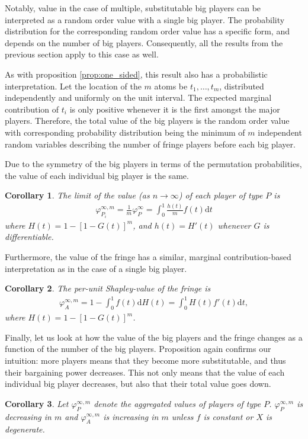 \documentclass[a4paper]{article}
\newtheorem{corollary}{Corollary}
\newcommand{\dt}{\mathrm{d}t}
\newcommand{\dH}{\mathrm{d}H}
\begin{document}
Notably, value in the case of multiple, substitutable big players can be interpreted as a random order value with a single big player.
The probability distribution for the corresponding random order value has a specific form, and depends on the number of big players.
Consequently, all the results from the previous section apply to this case as well.

As with proposition \ref{prop:one_sided}, this result also has a probabilistic interpretation.
Let the location of the $m$ atoms be $t_1, \dots, t_m$, distributed independently and uniformly on the unit interval.
The expected marginal contribution of $t_i$ is only positive whenever it is the first amongst the major players.
Therefore, the total value of the big players is the random order value with corresponding probability distribution being the minimum of $m$ independent random variables describing the number of fringe players before each big player.

Due to the symmetry of the big players in terms of the permutation probabilities, the value of each individual big player is the same.
\begin{corollary}
    \label{prop:multiple_platforms_individual}
    The limit of the value (as $n \to \infty$) of each player of type $P$ is
    \begin{align*}
        \varphi_{P_i}^{\infty, m} = \frac{1}{m} \varphi_P^\infty = \int_0^1 \frac{h(t)}{m} f(t) \dt
    \end{align*}
    where $H(t) = 1 - [1 - G(t)]^m$, and $h(t) = H'(t)$ whenever $G$ is differentiable.
\end{corollary}
Furthermore, the value of the fringe has a similar, marginal contribution-based interpretation as in the case of a single big player.
\begin{corollary}
    \label{cor:multiple_platforms}
    The per-unit Shapley-value of the fringe is
    \begin{align*}
        \varphi_A^{\infty, m} = 1 - \int_0^1 f(t) \dH(t) = \int_0^1 H(t) f'(t) \dt,
    \end{align*}
    where $H(t) = 1 - [1 - G(t)]^m$.
\end{corollary}

Finally, let us look at how the value of the big players and the fringe changes as a function of the number of the big players.
Proposition  again confirms our intuition: more players means that they become more substitutable, and thus their bargaining power decreases.
This not only means that the value of each individual big player decreases, but also that their total value goes down.
\begin{corollary}
    \label{cor:multiple_platforms_2}
    Let $\varphi_{P}^{\infty, m}$ denote the aggregated values of players of type $P$. $\varphi_{P}^{\infty, m}$ is decreasing in $m$ and $\varphi_{A}^{\infty, m}$ is increasing in $m$ unless $f$ is constant or $X$ is degenerate.
\end{corollary}
\end{document}
